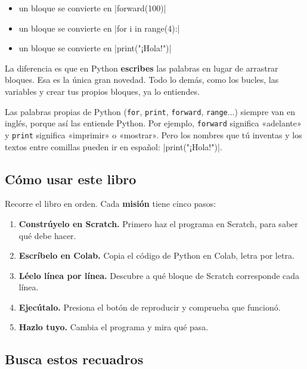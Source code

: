 \begin{itemize}
  \item un bloque  se convierte en \py|forward(100)|
  \item un bloque  se convierte en \py|for i in range(4):|
  \item un bloque  se convierte en \py|print("¡Hola!")|
\end{itemize}

La diferencia es que en Python \textbf{escribes} las palabras en lugar de arrastrar bloques. Esa es la única gran novedad. Todo lo demás, como los bucles, las variables y crear tus propios bloques, ya lo entiendes.

\begin{think}
Las palabras propias de Python (\texttt{for}, \texttt{print}, \texttt{forward}, \texttt{range}...) siempre van en inglés, porque así las entiende Python. Por ejemplo, \texttt{forward} significa «adelante» y \texttt{print} significa «imprimir» o «mostrar». Pero los nombres que tú inventas y los textos entre comillas pueden ir en español: \py|print("¡Hola!")|.
\end{think}

\subsection*{Cómo usar este libro}

Recorre el libro en orden. Cada \textbf{misión} tiene cinco pasos:

\begin{enumerate}[label=\textbf{\arabic*.}]
  \item \textbf{Constrúyelo en Scratch.} Primero haz el programa en Scratch, para saber qué debe hacer.
  \item \textbf{Escríbelo en Colab.} Copia el código de Python en Colab, letra por letra.
  \item \textbf{Léelo línea por línea.} Descubre a qué bloque de Scratch corresponde cada línea.
  \item \textbf{Ejecútalo.} Presiona el botón de reproducir y comprueba que funcionó.
  \item \textbf{Hazlo tuyo.} Cambia el programa y mira qué pasa.
\end{enumerate}

\subsection*{Busca estos recuadros}

